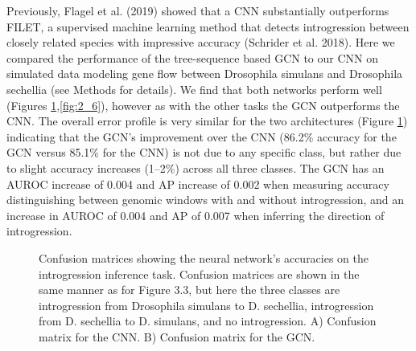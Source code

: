 Previously, Flagel et al. (2019) showed that a CNN substantially outperforms FILET, a supervised machine learning method that detects introgression between closely related species with impressive accuracy (Schrider et al. 2018). Here we compared the performance of the tree-sequence based GCN to our CNN on simulated data modeling gene flow between Drosophila simulans and Drosophila sechellia (see Methods for details). We find that both networks perform well (Figures \ref{fig:2_5},\ref{fig:2_6}), however as with the other tasks the GCN outperforms the CNN. The overall error profile is very similar for the two architectures (Figure \ref{fig:2_5}) indicating that the GCN's improvement over the CNN (86.2\% accuracy for the GCN versus 85.1\% for the CNN) is not due to any specific class, but rather due to slight accuracy increases (1–2\%) across all three classes. The GCN has an AUROC increase of 0.004 and AP increase of 0.002 when measuring accuracy distinguishing between genomic windows with and without introgression, and an increase in AUROC of 0.004 and AP of 0.007 when inferring the direction of introgression.


\begin{figure}
    \centering
    \caption[Confusion matrices showing the neural network’s accuracies on the introgression inference task]{Confusion matrices showing the neural network’s accuracies on the introgression inference task. Confusion matrices are shown in the same manner as for Figure 3.3, but here the three classes are introgression from Drosophila simulans to D. sechellia, introgression from D. sechellia to D. simulans, and no introgression. A) Confusion matrix for the CNN. B) Confusion matrix for the GCN.}
    \label{fig:2_5}
\end{figure}

